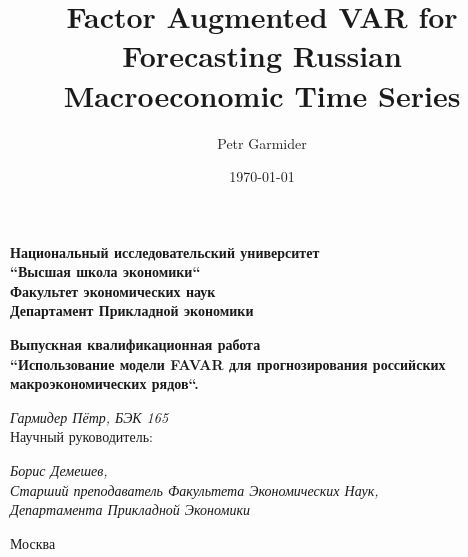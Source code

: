 \documentclass[a4paper, 14pt]{article}
\title{Factor Augmented VAR for Forecasting Russian Macroeconomic Time Series}
\author{Petr Garmider}
\date{\today}
\begin{document}
	\newpage
	\thispagestyle{empty}
	\begin{center}
		
		\vspace{0.1ex}
		
		{\textbf{Национальный исследовательский университет \\``Высшая школа экономики`` }}\\
		\vspace{1ex}
		{\textbf{Факультет экономических наук}}\\
		\vspace{1ex}
		{\textbf{
				Департамент Прикладной экономики}}\\
		
	\end{center}
	\vspace{5ex}
	\begin{center}
		\vspace{3ex}
		{\textbf{Выпускная квалификационная работа}}\\
		\vspace{3ex}
		{
			\vspace{2ex} \textbf{``Использование модели FAVAR для прогнозирования российских макроэкономических рядов``.}}
	\end{center}
	\begin{flushright}
		\vspace{5ex}
		\noindent
		\textit{Гармидер Пётр, БЭК 165}
		\\
		\vspace{5ex}
		Научный руководитель:\\
		\vspace{2ex}
		
		\textit{Борис Демешев, \\Старший преподаватель Факультета Экономических Наук, \\Департамента Прикладной Экономики}\\
		
		
	\end{flushright}

	\vspace{18ex}
	
	\begin{center}
		\vspace{3ex}
		{Москва}\\
		\vspace{1ex}{17 Апреля 2020}
	\end{center}	
	
	\newpage
	\tableofcontents
	\newpage
	
\end{document}
